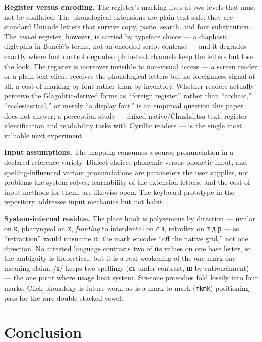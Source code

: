 \documentclass[11pt]{article}
\newcommand{\cz}[1]{{\chu #1}}
\newcommand{\ph}[1]{{\ipafont/#1/}}
\begin{document}
\textbf{Register versus encoding.} The register's marking lives at two levels that must not be conflated. The phonological extensions are plain-text-safe: they are standard Unicode letters that survive copy, paste, search, and font substitution. The \emph{visual} register, however, is carried by typeface choice — a diaphasic diglyphia in Bun\v{c}i\'c's terms, not an encoded script contrast — and it degrades exactly where font control degrades: plain-text channels keep the letters but lose the look. The register is moreover invisible to non-visual access — a screen reader or a plain-text client receives the phonological letters but no foreignness signal at all, a cost of marking by font rather than by inventory. Whether readers actually perceive the Glagolitic-derived forms as ``foreign register'' rather than ``archaic,'' ``ecclesiastical,'' or merely ``a display font'' is an empirical question this paper does not answer; a perception study — mixed native/Chuzhditsa text, register-identification and readability tasks with Cyrillic readers — is the single most valuable next experiment.

\textbf{Input assumptions.} The mapping consumes a source pronunciation in a declared reference variety. Dialect choice, phonemic versus phonetic input, and spelling-influenced variant pronunciations are parameters the user supplies, not problems the system solves; learnability of the extension letters, and the cost of input methods for them, are likewise open. The keyboard prototype in the repository addresses input mechanics but not habit.

\textbf{System-internal residue.} The place hook is polysemous by direction — uvular on \cz{к}, pharyngeal on \cz{х}, \emph{fronting} to interdental on \cz{с з}, retroflex on \cz{т д р} — so ``retraction'' would misname it; the mark encodes ``off the native grid,'' not one direction. No attested language contrasts two of its values on one base letter, so the ambiguity is theoretical, but it is a real weakening of the one-mark-one-meaning claim. \ph{ɕ} keeps two spellings (\cz{сь} under contrast, \cz{ш} by entrenchment) — the one point where usage beat system. Six-tone prosodies fold lossily into four marks. Click phonology is future work, as is a mark-to-mark (\texttt{mkmk}) positioning pass for the rare double-stacked vowel.

\section{Conclusion}
\end{document}
